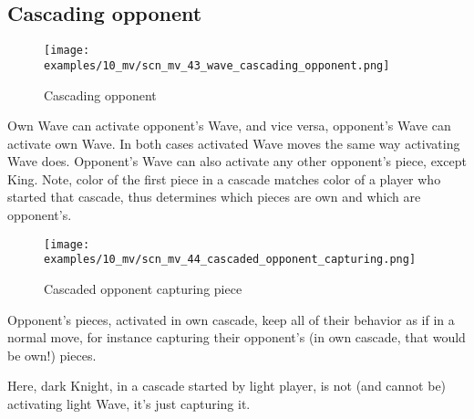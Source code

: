 \clearpage %

\subsection*{Cascading opponent}
\label{sec:Miranda's veil/Wave/Cascading opponent}

\vspace*{-1.4\baselineskip}
\noindent
\begin{figure}[h]
\texttt{[image: examples/10\_mv/scn\_mv\_43\_wave\_cascading\_opponent.png]}
\caption{Cascading opponent}
\label{fig:scn_mv_43_wave_cascading_opponent}
\end{figure}

Own Wave can activate opponent's Wave, and vice versa, opponent's Wave can activate
own Wave. In both cases activated Wave moves the same way activating Wave does.
Opponent's Wave can also activate any other opponent's piece, except King. Note,
color of the first piece in a cascade matches color of a player who started that
cascade, thus determines which pieces are own and which are opponent's.


\clearpage %

\vspace*{-2.1\baselineskip}
\noindent
\begin{figure}[h]
\texttt{[image: examples/10\_mv/scn\_mv\_44\_cascaded\_opponent\_capturing.png]}
\caption{Cascaded opponent capturing piece}
\label{fig:scn_mv_44_cascaded_opponent_capturing}
\end{figure}

Opponent's pieces, activated in own cascade, keep all of their behavior as if in a
normal move, for instance capturing their opponent's (in own cascade, that would be
own!) pieces.

Here, dark Knight, in a cascade started by light player, is not (and cannot be)
activating light Wave, it's just capturing it.

